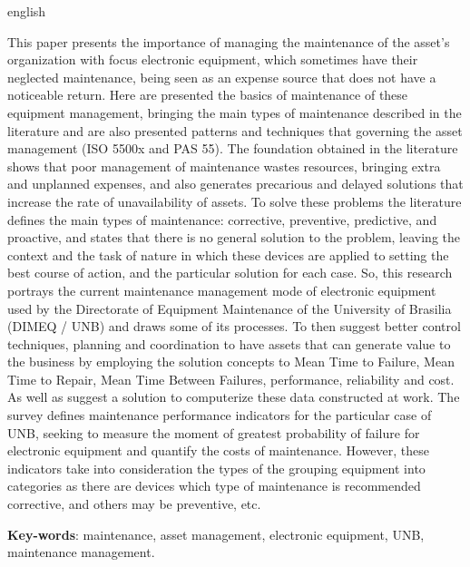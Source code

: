 \begin{resumo}[Abstract]
 \begin{otherlanguage*}{english}
 
This paper presents the importance of managing the maintenance of the asset’s organization with focus electronic equipment, which sometimes have their neglected maintenance, being seen as an expense source that does not have a noticeable return. Here are presented the basics of maintenance of these equipment management, bringing the main types of maintenance described in the literature and are also presented patterns and techniques that governing the asset management (ISO 5500x and PAS 55).
The foundation obtained in the literature shows that poor management of maintenance wastes resources, bringing extra and unplanned expenses, and also generates precarious and delayed solutions that increase the rate of unavailability of assets. To solve these problems the literature defines the main types of maintenance: corrective, preventive, predictive, and proactive, and states that there is no general solution to the problem, leaving the context and the task of nature in which these devices are applied to setting the best course of action, and the particular solution for each case.
So, this research portrays the current maintenance management mode of electronic equipment used by the Directorate of Equipment Maintenance of the University of Brasilia (DIMEQ / UNB) and draws some of its processes. To then suggest better control techniques, planning and coordination to have assets that can generate value to the business by employing the solution concepts to Mean Time to Failure,  Mean Time to Repair,  Mean Time Between Failures, performance, reliability and cost. As well as suggest a solution to computerize these data constructed at work.
The survey defines maintenance performance indicators for the particular case of UNB, seeking to measure the moment of greatest probability of failure for electronic equipment and quantify the costs of maintenance. However, these indicators take into consideration the types of the grouping equipment into categories as there are devices which type of maintenance is recommended corrective, and others may be preventive, etc.


   \vspace{\onelineskip}
 
   \noindent 
   \textbf{Key-words}: maintenance, asset management, electronic equipment, UNB, maintenance management.
 \end{otherlanguage*}
\end{resumo}


